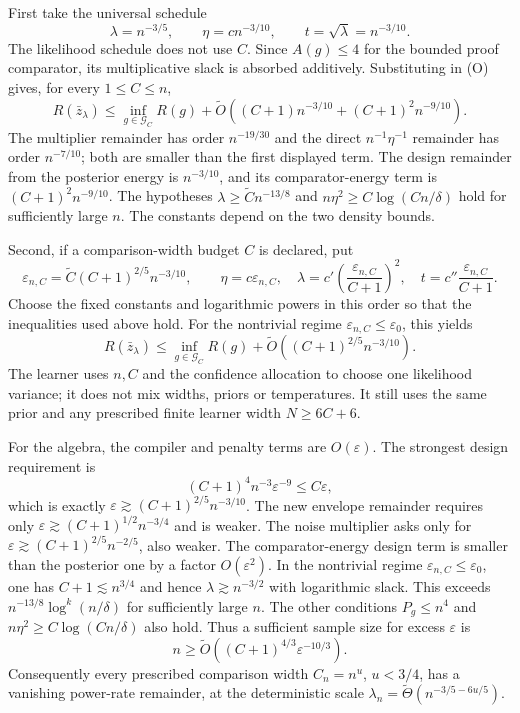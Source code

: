 First take the universal schedule
\[
 \lambda=n^{-3/5},\qquad \eta=c n^{-3/10},
 \qquad t=\sqrt\lambda=n^{-3/10}.
\]
The likelihood schedule does not use $C$. Since $A(g)\le4$ for the
bounded proof comparator, its multiplicative slack is absorbed
additively. Substituting in (O) gives, for every $1\le C\le n$,
\[
 R(\bar z_\lambda)\le\inf_{g\in\mathcal G_C}R(g)
 +\widetilde O\left((C+1)n^{-3/10}
                   +(C+1)^2n^{-9/10}\right). \tag{U}
\]
The multiplier remainder has order $n^{-19/30}$ and the direct
$n^{-1}\eta^{-1}$ remainder has order $n^{-7/10}$; both are smaller
than the first displayed term. The design remainder from the
posterior energy is $n^{-3/10}$, and its comparator-energy term is
$(C+1)^2n^{-9/10}$. The hypotheses $\lambda\ge\widetilde C n^{-13/8}$ and
$n\eta^2\ge C\log(Cn/\delta)$ hold for sufficiently large $n$.
The constants depend on the two density bounds.

Second, if a comparison-width budget $C$ is declared, put
\[
 \varepsilon_{n,C}
 =\widetilde C(C+1)^{2/5}n^{-3/10},\qquad
 \eta=c\varepsilon_{n,C},\quad
 \lambda=c'\left(\frac{\varepsilon_{n,C}}{C+1}\right)^2,\quad
 t=c''\frac{\varepsilon_{n,C}}{C+1}.
\]
Choose the fixed constants and logarithmic powers in this order
so that the inequalities used above hold. For the nontrivial regime
$\varepsilon_{n,C}\le\varepsilon_0$, this yields
\[
 R(\bar z_\lambda)\le\inf_{g\in\mathcal G_C}R(g)
 +\widetilde O\left((C+1)^{2/5}n^{-3/10}\right). \tag{B}
\]
The learner uses $n,C$ and the confidence allocation to choose
one likelihood variance; it does not mix widths, priors or
temperatures. It still uses the same prior and any prescribed
finite learner width $N\ge6C+6$.

For the algebra, the compiler and penalty terms are $O(\varepsilon)$.
The strongest design requirement is
\[
 (C+1)^4 n^{-3}\varepsilon^{-9}\le C\varepsilon,
\]
which is exactly $\varepsilon\gtrsim(C+1)^{2/5}n^{-3/10}$.
The new envelope remainder requires only
$\varepsilon\gtrsim(C+1)^{1/2}n^{-3/4}$ and is weaker.
The noise multiplier asks only for
$\varepsilon\gtrsim(C+1)^{2/5}n^{-2/5}$, also weaker.
The comparator-energy design term is smaller than the posterior
one by a factor $O(\varepsilon^2)$.
In the nontrivial regime $\varepsilon_{n,C}\le\varepsilon_0$,
one has $C+1\lesssim n^{3/4}$ and hence
$\lambda\gtrsim n^{-3/2}$ with logarithmic slack. This exceeds
$n^{-13/8}\log^k(n/\delta)$ for sufficiently large $n$.
The other conditions $P_g\le n^4$ and
$n\eta^2\ge C\log(Cn/\delta)$ also hold.
Thus a sufficient sample size for excess $\varepsilon$ is
\[
 n\ge\widetilde O\left(
 (C+1)^{4/3}\varepsilon^{-10/3}\right). \tag{SC}
\]
Consequently every prescribed comparison width $C_n=n^u$, $u<3/4$,
has a vanishing power-rate remainder, at the deterministic scale
$\lambda_n=\widetilde\Theta(n^{-3/5-6u/5})$.
